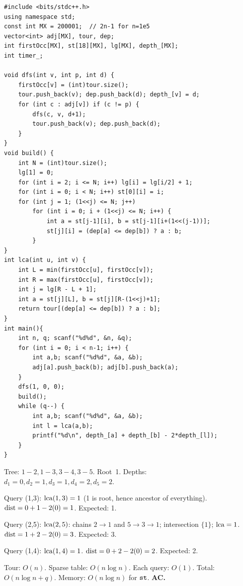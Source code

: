 \begin{lstlisting}[caption={CSES 1135 full solution (Euler + RMQ)}, label={lst:c11-1135-soln}]
#include <bits/stdc++.h>
using namespace std;
const int MX = 200001;  // 2n-1 for n=1e5
vector<int> adj[MX], tour, dep;
int firstOcc[MX], st[18][MX], lg[MX], depth_[MX];
int timer_;

void dfs(int v, int p, int d) {
    firstOcc[v] = (int)tour.size();
    tour.push_back(v); dep.push_back(d); depth_[v] = d;
    for (int c : adj[v]) if (c != p) {
        dfs(c, v, d+1);
        tour.push_back(v); dep.push_back(d);
    }
}
void build() {
    int N = (int)tour.size();
    lg[1] = 0;
    for (int i = 2; i <= N; i++) lg[i] = lg[i/2] + 1;
    for (int i = 0; i < N; i++) st[0][i] = i;
    for (int j = 1; (1<<j) <= N; j++)
        for (int i = 0; i + (1<<j) <= N; i++) {
            int a = st[j-1][i], b = st[j-1][i+(1<<(j-1))];
            st[j][i] = (dep[a] <= dep[b]) ? a : b;
        }
}
int lca(int u, int v) {
    int L = min(firstOcc[u], firstOcc[v]);
    int R = max(firstOcc[u], firstOcc[v]);
    int j = lg[R - L + 1];
    int a = st[j][L], b = st[j][R-(1<<j)+1];
    return tour[(dep[a] <= dep[b]) ? a : b];
}
int main(){
    int n, q; scanf("%d%d", &n, &q);
    for (int i = 0; i < n-1; i++) {
        int a,b; scanf("%d%d", &a, &b);
        adj[a].push_back(b); adj[b].push_back(a);
    }
    dfs(1, 0, 0);
    build();
    while (q--) {
        int a,b; scanf("%d%d", &a, &b);
        int l = lca(a,b);
        printf("%d\n", depth_[a] + depth_[b] - 2*depth_[l]);
    }
}
\end{lstlisting}

\begin{tracebox}
Tree: \(1\!-\!2, 1\!-\!3, 3\!-\!4, 3\!-\!5\).  Root~1.
Depths: \(d_1=0, d_2=1, d_3=1, d_4=2, d_5=2\).

Query (1,3): \(\operatorname{lca}(1,3)=1\) (1 is root, hence ancestor of everything).
\(\operatorname{dist} = 0+1-2(0) = 1\).  Expected: 1.  \checkmark

Query (2,5): \(\operatorname{lca}(2,5)\): chains \(2\to1\) and \(5\to3\to1\); intersection
\(\{1\}\); \(\operatorname{lca}=1\).
\(\operatorname{dist} = 1+2-2(0) = 3\).  Expected: 3.  \checkmark

Query (1,4): \(\operatorname{lca}(1,4)=1\).
\(\operatorname{dist} = 0+2-2(0) = 2\).  Expected: 2.  \checkmark
\end{tracebox}

\begin{complexitybox}
Tour: \(O(n)\).  Sparse table: \(O(n \log n)\).  Each query: \(O(1)\).
Total: \(O(n\log n + q)\).  Memory: \(O(n\log n)\) for \(\texttt{st}\).
\textbf{AC.}
\end{complexitybox}


